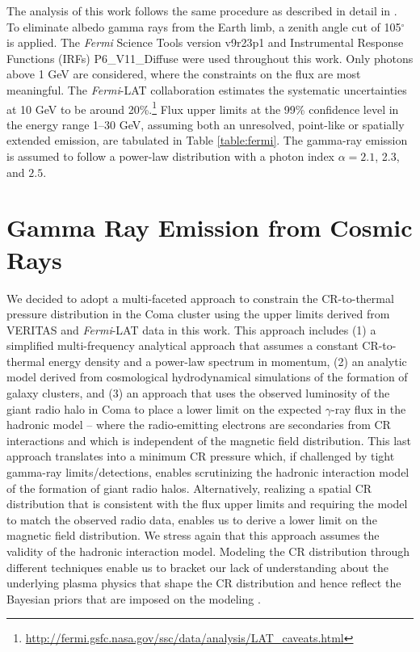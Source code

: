 \documentclass[12pt,manuscript]{aastex}
\def\Fermi{{\em Fermi}\xspace}
\begin{document}
The analysis of this work follows the same procedure as described in detail in
\citet{article:Abdo_etal:2009}. To eliminate albedo gamma rays from the Earth limb, a zenith angle
cut of 105$^{\circ}$ is applied. The \Fermi Science Tools version v9r23p1 and Instrumental
Response Functions (IRFs) P6\_V11\_Diffuse were used throughout this work. Only photons above 1 GeV
are considered, where the constraints on the flux are most meaningful. The \Fermi-LAT collaboration
estimates the systematic uncertainties at 10 GeV to be around
20\%.\footnote{\url{http://fermi.gsfc.nasa.gov/ssc/data/analysis/LAT\_caveats.html}} Flux upper
limits at the 99\% confidence level in the energy range 1--30 GeV, assuming both an unresolved,
point-like or spatially extended emission, are tabulated in Table \ref{table:fermi}. The gamma-ray
emission is assumed to follow a power-law distribution with a photon index $\alpha=2.1$, 2.3, and
$2.5$.

%
%

\section{Gamma Ray Emission from Cosmic Rays}
We decided to adopt a multi-faceted approach to constrain the CR-to-thermal pressure distribution in
the Coma cluster using the upper limits derived from VERITAS and \Fermi-LAT data in this work. This
approach includes (1) a simplified multi-frequency analytical approach that assumes a constant
CR-to-thermal energy density and a power-law spectrum in momentum, (2) an analytic model derived
from cosmological hydrodynamical simulations of the formation of galaxy clusters, and (3) an
approach that uses the observed luminosity of the giant radio halo in Coma to place a lower limit on
the expected $\gamma$-ray flux in the hadronic model -- where the radio-emitting electrons are
secondaries from CR interactions and which is independent of the magnetic field distribution.  This
last approach translates into a minimum CR pressure which, if challenged by tight gamma-ray
limits/detections, enables scrutinizing the hadronic interaction model of the formation of giant
radio halos. Alternatively, realizing a spatial CR distribution that is consistent with the flux
upper limits and requiring the model to match the observed radio data, enables us to derive a
lower limit on the magnetic field distribution. We stress again that this approach assumes the
validity of the hadronic interaction model. Modeling the CR distribution through different
techniques enable us to bracket our lack of understanding about the underlying plasma physics that
shape the CR distribution and hence reflect the Bayesian priors that are imposed on the modeling
\citep[see][for a discussion]{article:PinzkePfrommerBergstrom}.
\end{document}
